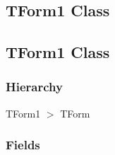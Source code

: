 \documentclass{report}
\begin{document}
\subsection*{\large{\textbf{TForm1 Class}}\normalsize\hspace{1ex}\hrulefill}
\else
\subsection*{TForm1 Class}
\fi
\label{mnupdate.TForm1}
\subsubsection*{\large{\textbf{Hierarchy}}\normalsize\hspace{1ex}\hfill}
TForm1 {$>$} TForm
\subsubsection*{\large{\textbf{Fields}}\normalsize\hspace{1ex}\hfill}
\end{document}
